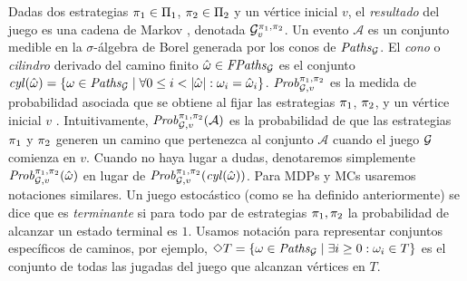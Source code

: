 Dadas dos estrategias $\pi_{1} \in \Pi_{1}$, $\pi_{2} \in \Pi_{2}$ y un vértice inicial $v$,  el \emph{resultado} del juego es una cadena de Markov \cite{ChatterjeeH12}, denotada 
$\mathcal{G}^{\pi_{1}, \pi_{2}}_v$. Un evento $\mathcal{A}$ es un conjunto medible en la $\sigma$-álgebra de Borel generada por los conos de $\mathit{Paths}_{\mathcal{G}}$. El \emph{cono} o \emph{cilindro} derivado del camino finito $\hat{\omega} \in \mathit{FPaths}_{\mathcal{G}}$ es el conjunto $\mathit{cyl}(\hat{\omega})=\{\omega \in \mathit{Paths}_{\mathcal{G}} \mid \forall 0 \leq i < |\hat{\omega}|: \omega_i = \hat{\omega}_i \}$. $\mathit{Prob}^{\pi_{1}, \pi_{2}}_{\mathcal{G},v}$ es la medida de probabilidad asociada que se obtiene al fijar las estrategias $\pi_{1}$, $\pi_{2}$, y un vértice inicial $v$  \cite{ChatterjeeH12}. Intuitivamente, $\mathit{Prob}^{\pi_{1}, \pi_{2}}_{\mathcal{G},v}(\mathcal{A})$
es la probabilidad de que las estrategias $\pi_{1}$ y $\pi_{2}$ generen un camino que pertenezca al conjunto $\mathcal{A}$ cuando el juego $\mathcal{G}$ comienza en $v$. Cuando no haya lugar a dudas, denotaremos simplemente $\mathit{Prob}^{\pi_{1}, \pi_{2}}_{\mathcal{G},v}(\hat{\omega})$ en lugar de $\mathit{Prob}^{\pi_{1}, \pi_{2}}_{\mathcal{G},v}(\mathit{cyl}(\hat{\omega}))$.
Para MDPs y MCs usaremos notaciones similares. Un juego estocástico (como se ha definido anteriormente) se dice que es \emph{terminante} \cite{Condon92} si para todo par de estrategias $\pi_{1}, \pi_{2}$ la probabilidad de alcanzar un estado terminal es $1$. Usamos notación {\LTL} para representar conjuntos específicos de caminos, por ejemplo, $\Diamond T = \{\omega \in \mathit{Paths}_{\mathcal{G}} \mid \exists i \geq 0 : \omega_i \in T \}$ es el conjunto de todas las jugadas del juego que alcanzan vértices en $T$.




